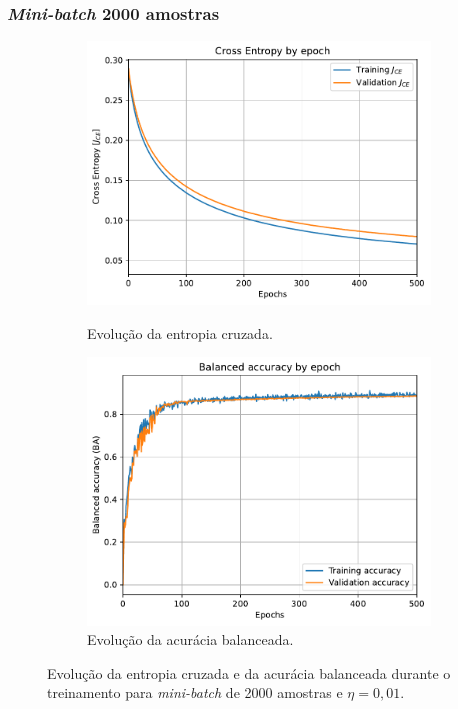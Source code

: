 \subsubsection*{\textit{Mini-batch} 2000 amostras}

\begin{figure}[H]
	\begin{subfigure}[H]{0.49\textwidth}
		\centering
		\includegraphics[width = 0.98\linewidth]{../../plot/LR_1/CE_500_epochs_batch_size2000}
		\label{fig:CE_500_epochs_batch_size2000}
		\caption{Evolução da entropia cruzada.}
	\end{subfigure}
	\begin{subfigure}[H]{0.49\textwidth}
		\centering
		\includegraphics[width = 0.99\linewidth]{../../plot/LR_1/BA_500_epochs_batch_size2000}
		\caption{Evolução da acurácia balanceada.}
		\label{fig:BA_500_epochs_batch_size2000}
	\end{subfigure}
	\caption{Evolução da entropia cruzada e da acurácia balanceada durante o treinamento para \textit{mini-batch} de 2000 amostras e $\eta = 0,01$.}
\end{figure}

